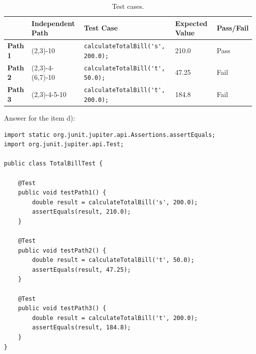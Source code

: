 \begin{solution}
    \begin{table}[H]
        \centering
        \renewcommand{\arraystretch}{1.2}
        \caption{Test cases.}
        \label{tab:ex3-test-cases}
        \begin{adjustbox}{max width=\textwidth}
            \begin{tabular}{lllll}
                \toprule
                 & Independent Path & Test Case & Expected Value & Pass/Fail\\
                \midrule
                \textbf{Path 1} & (2,3)-10 & \lstinline!calculateTotalBill('s', 200.0);! & 210.0 & Pass\\
                \textbf{Path 2} & (2,3)-4-(6,7)-10 & \lstinline!calculateTotalBill('t', 50.0);! & 47.25 & Fail\\
                \textbf{Path 3} & (2,3)-4-5-10 & \lstinline!calculateTotalBill('t', 200.0);! & 184.8 & Fail\\
                \bottomrule
            \end{tabular}
        \end{adjustbox}
    \end{table}
    
    Answer for the item d):
    \begin{lstlisting}[caption={A proposed answer for the item d).}]
import static org.junit.jupiter.api.Assertions.assertEquals;
import org.junit.jupiter.api.Test;

public class TotalBillTest {

    @Test
    public void testPath1() {
        double result = calculateTotalBill('s', 200.0);
        assertEquals(result, 210.0);
    }
    
    @Test
    public void testPath2() {
        double result = calculateTotalBill('t', 50.0);
        assertEquals(result, 47.25);
    }
    
    @Test
    public void testPath3() {
        double result = calculateTotalBill('t', 200.0);
        assertEquals(result, 184.8);
    }
}
    \end{lstlisting}

\end{solution}

